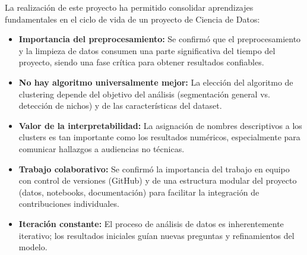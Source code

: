 La realización de este proyecto ha permitido consolidar aprendizajes fundamentales en el ciclo de vida de un proyecto de Ciencia de Datos:

\begin{itemize}
    \item \textbf{Importancia del preprocesamiento:} Se confirmó que el preprocesamiento y la limpieza de datos consumen una parte significativa del tiempo del proyecto, siendo una fase crítica para obtener resultados confiables.
    
    \item \textbf{No hay algoritmo universalmente mejor:} La elección del algoritmo de clustering depende del objetivo del análisis (segmentación general vs. detección de nichos) y de las características del dataset.
    
    \item \textbf{Valor de la interpretabilidad:} La asignación de nombres descriptivos a los clusters es tan importante como los resultados numéricos, especialmente para comunicar hallazgos a audiencias no técnicas.
    
    \item \textbf{Trabajo colaborativo:} Se confirmó la importancia del trabajo en equipo con control de versiones (GitHub) y de una estructura modular del proyecto (datos, notebooks, documentación) para facilitar la integración de contribuciones individuales.
    
    \item \textbf{Iteración constante:} El proceso de análisis de datos es inherentemente iterativo; los resultados iniciales guían nuevas preguntas y refinamientos del modelo.
\end{itemize}